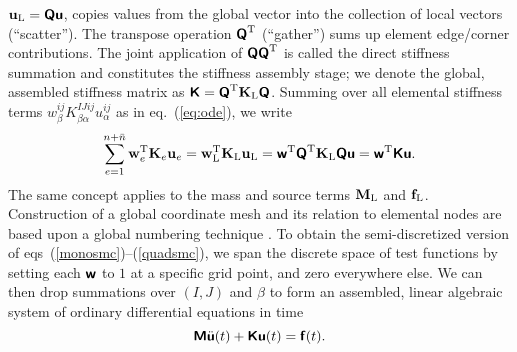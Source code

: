 \documentclass[11pt,letter,fleqn,english,notitlepage]{article}
\newcommand{\eq}{\begin{equation}} \newcommand{\en}{\end{equation}}
\newcommand{\bu}{\mbox{${\bf u}$}} \newcommand{\bv}{\mbox{${\bf v}$}}
\newcommand{\bM}{\mbox{${\bf M}$}} \newcommand{\bT}{\mbox{${\bf T}$}}
\newcommand{\bK}{\mbox{${\bf K}$}} \newcommand{\bS}{\mbox{${\bf S}$}}
\newcommand{\bsfM}{\mbox{\boldmath $\bf {\mathsf M}$}}
\newcommand{\bsfK}{\mbox{\boldmath $\bf {\mathsf K}$}}
\newcommand{\bsfu}{\mbox{\boldmath $\bf {\mathsf u}$}}
\newcommand{\bsfw}{\mbox{\boldmath $\bf {\mathsf w}$}}
\newcommand{\bsff}{\mbox{\boldmath $\bf {\mathsf f}$}}
\newcommand{\bsfQ}{\mbox{\boldmath $\bf {\mathsf Q}$}}
\begin{document}
$\bu_{\rm{L}}=\bsfQ\bsfu$, copies values from the global vector into the 
collection of local vectors (``scatter''). The transpose operation 
$\bsfQ^{\rm{T}}$ (``gather'') sums up element edge/corner
contributions. The joint application of $\bsfQ\bsfQ^{\rm{T}}$ is called the 
direct stiffness summation and constitutes the stiffness assembly stage; we
denote the global, assembled stiffness matrix as 
$\bsfK=\bsfQ^{\rm{T}}\bK_{\rm{L}}\bsfQ$. 
Summing over all elemental stiffness terms 
$w_\beta^{ij} K^{IJij}_{\beta\alpha}u_\alpha^{ij}$ as in eq.~(\ref{eq:ode}), 
we write 
%
\eq \label{eq:stiff_el_glob}
\sum^{n+\bar{n}}_{e=1}\bw_e^{\rm{T}}\bK_e \bu_e=
\bw_{\rm{L}}^{\rm{T}} \bK_{\rm{L}} \bu_{\rm L}=
\bsfw^{\rm{T}}\bsfQ^{\rm{T}} \bK_{\rm L} \bsfQ \bsfu = 
\bsfw^{\rm{T}} \bsfK \bsfu.
\en
%
The same concept applies to the mass and source terms $\bM_{\rm{L}}$ and 
$\mathbf{f}_{\rm{L}}$. Construction of a global coordinate mesh and its 
relation to elemental nodes are based upon a global numbering 
technique \citep{dfm}. To obtain the semi-discretized version of 
eqs~(\ref{monosmc})--(\ref{quadsmc}), we span the discrete space of test 
functions by setting each $\bsfw$ to $1$ at a specific grid point, and 
zero everywhere else. We can then drop summations over $(I,J)$ and 
$\beta$ to form an assembled, linear algebraic system of ordinary differential 
equations in time 
%
\eq \label{eq:global_ode}
\bsfM\ddot{\bsfu}(t)+\bsfK\bsfu(t)=\bsff(t).
\en
%
\end{document}
